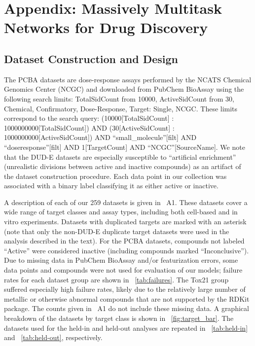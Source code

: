 \section{Appendix: Massively Multitask Networks for Drug Discovery}

\subsection{Dataset Construction and Design}

The PCBA datasets are dose-response assays performed by the NCATS Chemical Genomics Center (NCGC) and downloaded from PubChem BioAssay using the following search limits: TotalSidCount from 10000, ActiveSidCount from 30, Chemical, Confirmatory, Dose-Response, Target: Single, NCGC. These limits correspond to the search query: (10000[TotalSidCount] :
1000000000[TotalSidCount]) AND (30[ActiveSidCount] :
1000000000[ActiveSidCount]) AND ``small\_molecule''[filt] AND
``doseresponse''[filt] AND 1[TargetCount] AND ``NCGC''[SourceName].  We note that the DUD-E datasets are especially susceptible to ``artificial enrichment'' (unrealistic divisions between active and inactive compounds) as an artifact of the dataset construction procedure. Each data point in
our collection was associated with a binary label classifying it as either active or inactive.

A description of each of our 259 datasets is given in \tablename~A1.  These datasets cover a wide range of target classes and assay types, including both cell-based and in vitro experiments. Datasets with duplicated targets are marked with an asterisk (note that only the non-DUD-E duplicate target datasets were used in the analysis described in the text). For the PCBA datasets, compounds not labeled ``Active'' were considered inactive (including compounds marked ``Inconclusive''). Due to missing data in PubChem BioAssay and/or featurization errors, some data points and compounds were not used for evaluation of our models; failure rates for each dataset group are shown in \tablename~\ref{tab:failures}. The Tox21 group suffered especially high failure rates, likely due to the relatively large number of metallic or otherwise abnormal compounds that are not supported by the RDKit package.  The counts given in \tablename~A1 do not include these missing data. A graphical breakdown of the datasets by target class is shown in \figurename~\ref{fig:target_bar}. The datasets used for the held-in and held-out analyses are repeated in \tablename~\ref{tab:held-in} and \tablename~\ref{tab:held-out}, respectively.

